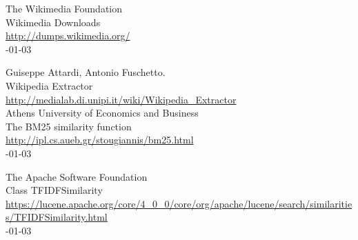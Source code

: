 \documentclass[11pt,letterpaper]{article}
\begin{document}
\begin{thebibliography}{}
The Wikimedia Foundation \\
\newblock Wikimedia Downloads \\
\newblock \url{http://dumps.wikimedia.org/} \\
-01-03

Guiseppe Attardi, Antonio Fuschetto. \\
\newblock Wikipedia Extractor \\
\newblock \url{http://medialab.di.unipi.it/wiki/Wikipedia_Extractor} \\

Athens University of Economics and Business \\
\newblock The BM25 similarity function \\
\newblock \url{http://ipl.cs.aueb.gr/stougiannis/bm25.html} \\
-01-03

The Apache Software Foundation \\
\newblock Class TFIDFSimilarity \\
\newblock \url{https://lucene.apache.org/core/4_0_0/core/org/apache/lucene/search/similarities/TFIDFSimilarity.html} \\
-01-03

\end{thebibliography}
\end{document}
